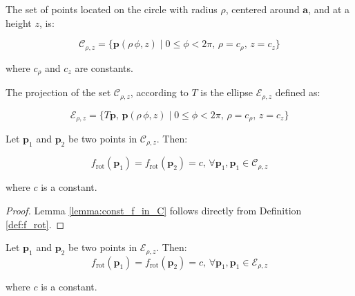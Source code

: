 \begin{definition}
The set of points located on the circle with radius $\rho$, centered around $\mathbf{a}$, and at a height $z$, is:

    \begin{equation}
        \mathcal{C}_{\rho,z}=\{ \mathbf{p}(\rho \, \phi, z) \; | \; 0 \leq \phi < 2\pi,\, \rho=c_\rho,\, z=c_z \}
    \end{equation}

    where $c_\rho$ and $c_z$ are constants.
\end{definition}

\begin{definition}
    The projection of the set $\mathcal{C}_{\rho,z}$, according to $T$ is the ellipse $\mathcal{E}_{\rho,z}$ defined as:

    \begin{equation}
        \mathcal{E}_{\rho,z}=\{ T\mathbf{p}, \, \mathbf{p}(\rho \, \phi, z) \; | \; 0 \leq \phi < 2\pi,\, \rho=c_\rho,\, z=c_z \}
    \end{equation}
\end{definition}

\begin{lemma}
\label{lemma:const_f_in_C}
Let $\mathbf{p}_1$ and $\mathbf{p}_2$ be two points in $\mathcal{C}_{\rho,z}$. Then:

    \begin{equation}
        f_\mathrm{rot}(\mathbf{p}_1)=f_\mathrm{rot}(\mathbf{p}_2)=c,\, \forall \mathbf{p}_1,\mathbf{p}_1 \in \mathcal{C}_{\rho,z}
    \end{equation}

    where $c$ is a constant.
\end{lemma}

\begin{proof}
    Lemma \ref{lemma:const_f_in_C} follows directly from Definition \ref{def:f_rot}.
\end{proof}

\begin{corollary}
    Let $\mathbf{p}_1$ and $\mathbf{p}_2$ be two points in $\mathcal{E}_{\rho,z}$. Then:
    \begin{equation}
        f_\mathrm{rot}(\mathbf{p}_1)=f_\mathrm{rot}(\mathbf{p}_2)=c,\, \forall \mathbf{p}_1,\mathbf{p}_1 \in \mathcal{E}_{\rho,z}
    \end{equation}

    where $c$ is a constant.
\end{corollary}

